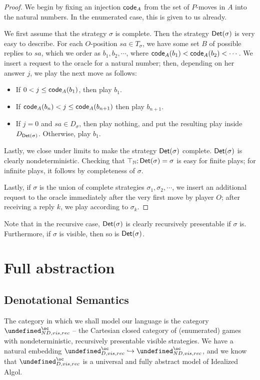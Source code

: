 \documentclass[sigplan,10pt,review]{acmart}\settopmatter{printfolios=true,printccs=false,printacmref=false}
\let\G\undefined
\begin{document}
\begin{proof}
  We begin by fixing an injection $\mathsf{code}_A$ from the set of $P$-moves in $A$ into the natural numbers.  
  In the enumerated case, this is given to us already.
  
  We first assume that the strategy $\sigma$ is complete.
  Then the strategy $\mathsf{Det}(\sigma)$ is very easy to describe.  
  For each $O$-position $sa\in T_\sigma$, we have some set $B$ of possible replies to $sa$, which we order as $b_1,b_2,\cdots$, where $\mathsf{code}_A(b_1)<\mathsf{code}_A(b_2)<\cdots$.  
  We insert a request to the oracle for a natural number; then, depending on her answer $j$, we play the next move as follows:
  \begin{itemize}
    \item If $0 < j \le \mathsf{code}_A(b_1)$, then play $b_1$.
    \item If $\mathsf{code}_A(b_n) < j \le \mathsf{code}_A(b_{n+1})$ then play $b_{n+1}$.
    \item If $j = 0$ and $sa\in D_\sigma$, then play nothing, and put the resulting play inside $D_{\mathsf{Det}(\sigma)}$.  
      Otherwise, play $b_1$.
  \end{itemize}
  Lastly, we close under limits to make the strategy $\mathsf{Det}(\sigma)$ complete.  
  $\mathsf{Det}(\sigma)$ is clearly nondeterministic.  
  Checking that $\top_{\mathbb{N}};\mathsf{Det}(\sigma)=\sigma$ is easy for finite plays; for infinite plays, it follows by completeness of $\sigma$.

  Lastly, if $\sigma$ is the union of complete strategies $\sigma_1,\sigma_2,\cdots$, we insert an additional request to the oracle immediately after the very first move by player $O$; after receiving a reply $k$, we play according to $\sigma_k$.
\end{proof}

Note that in the recursive case, $\mathsf{Det}(\sigma)$ is clearly recursively presentable if $\sigma$ is.  
Furthermore, if $\sigma$ is visible, then so is $\mathsf{Det}(\sigma)$.

\section{Full abstraction}

\subsection{Denotational Semantics}

The category in which we shall model our language is the category $\G_{ND,vis,rec}^\oc$ -- the Cartesian closed category of (enumerated) games with nondeterministic, recursively presentable visible strategies.  
We have a natural embedding $\G_{D,vis,rec}^\oc\hookrightarrow\G_{ND,vis,rec}^\oc$, and we know that $\G_{D,vis,rec}^\oc$ is a universal and fully abstract model of Idealized Algol.
\end{document}
